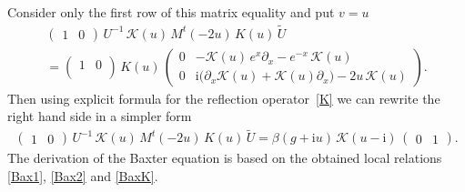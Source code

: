 \documentclass[11pt]{article}
\numberwithin{equation}{section}
\theoremstyle{plain}
\theoremstyle{definition}
\renewcommand{\imath}{\mathrm{i}}
\begin{document}
Consider only the first row of this matrix equality and put $v = u$
\begin{multline}
	\begin{pmatrix}
		1 & 0 
	\end{pmatrix}\,
	U^{-1}\,\mathcal{K}(u) \, M^t(-2u) \, K(u) \,\widetilde{U} \\
	= \begin{pmatrix}
		1 & 0 \\
	\end{pmatrix}\, K(u) \, 
	\begin{pmatrix}
		0 & -\mathcal{K}(u)\,e^{x}\partial_x-e^{-x}\,\mathcal{K}(u) \\[6pt]
		0 & \imath \bigl(\partial_x\mathcal{K}(u)+\mathcal{K}(u)\partial_x\bigr) - 
		2u\,\mathcal{K}(u)
	\end{pmatrix}.
\end{multline}
Then using explicit formula for the reflection operator~\eqref{K} we can rewrite the right hand side in a simpler form
\begin{align}\label{BaxK}
	\begin{pmatrix}
	1 & 0 
	\end{pmatrix}\,
	U^{-1}\,\mathcal{K}(u) \, M^t(-2u) \, K(u) \,\widetilde{U}  = \beta (g + \imath u) \, \mathcal{K}(u-\imath) \, 
	\begin{pmatrix}
		0 & 1
	\end{pmatrix}.
\end{align}
The derivation of the Baxter equation is based on the obtained local relations \eqref{Bax1}, \eqref{Bax2} and \eqref{BaxK}. 
\end{document}
